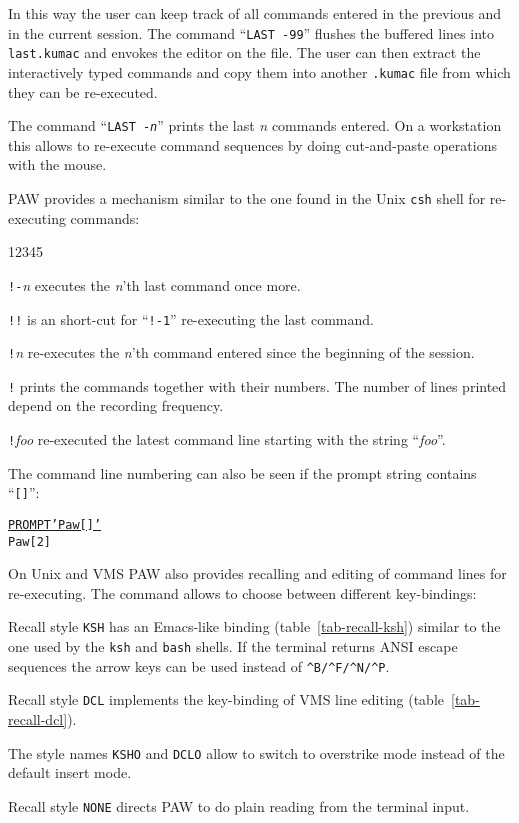 In this way the user can keep track of all commands entered in
the previous and in the current session.
The command ``\texttt{LAST -99}'' flushes the buffered lines into
\texttt{last.kumac} and envokes the editor on the file.
The user can then extract the interactively typed commands and copy
them into another \texttt{.kumac} file from which they can be
re-executed.

The command ``\texttt{LAST -\textsl{n}}'' prints the last \textsl{n}
commands entered.
On a workstation this allows to re-execute command sequences by doing
cut-and-paste operations with the mouse.

PAW provides a mechanism similar to the one found
in the Unix \texttt{csh} shell for re-executing commands:
\begin{DLtt}{12345}
\item[\texttt{!-}\textsl{n}]
executes the \textsl{n}'th last command once more. 
\item[\texttt{!!}]
is an short-cut for ``\texttt{!-1}'' re-executing the last command.
\item[\texttt{!}\textsl{n}]
re-executes the \textsl{n}'th command entered since the beginning of the
session.
\item[\texttt{!}]
prints the commands together with their numbers.
The number of lines printed depend on the recording frequency.
\item[\texttt{!}\textsl{foo}]
re-executed the latest command line starting with the string ``\textsl{foo}''.
\end{DLtt}

The command line numbering can also be seen if the prompt string
contains ``\texttt{[]}'':
\begin{alltt}
\PROMPT{} \underline{PROMPT 'Paw[] '}
Paw[2]
\end{alltt}

On Unix and VMS PAW also provides recalling and editing of command lines
for re-executing.
The command  allows to choose between different
key-bindings:
\begin{UL}
\item
Recall style \texttt{KSH} has an Emacs-like binding
(table~\ref{tab-recall-ksh}) similar to
the one used by the \texttt{ksh} and \texttt{bash} shells.
If the terminal returns ANSI escape sequences the arrow keys can be
used instead of \verb!^B/^F/^N/^P!. 

\item
Recall style \texttt{DCL} implements the key-binding of VMS line
editing (table~\ref{tab-recall-dcl}).

\item
The style names \texttt{KSHO} and \texttt{DCLO} allow to switch to overstrike
mode instead of the default insert mode.

\item
Recall style \texttt{NONE} directs PAW to do plain reading from the
terminal input. 
\end{UL}


